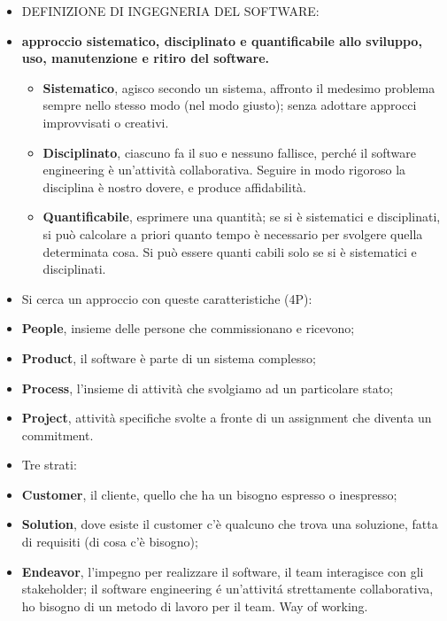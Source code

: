 \documentclass[a4paper,10pt] {article}
\begin{document}
\begin{itemize}
\item DEFINIZIONE DI INGEGNERIA DEL SOFTWARE:

\item \textbf{approccio sistematico, disciplinato e quantificabile allo sviluppo,
uso, manutenzione e ritiro del software.}
	\begin{itemize}
\item \textbf{Sistematico}, agisco secondo un sistema, affronto il medesimo
problema sempre nello stesso modo (nel modo
		giusto); senza adottare approcci improvvisati o creativi.

\item \textbf{Disciplinato}, ciascuno fa il suo e nessuno fallisce, perché il
software engineering è un'attività collaborativa. Seguire in modo
		rigoroso la disciplina è nostro dovere, e  produce affidabilità.

\item \textbf{Quantificabile}, esprimere una quantità; se si è sistematici e
disciplinati, si può calcolare a priori quanto tempo è necessario per
svolgere quella determinata cosa. Si può essere quanti cabili solo se si è
sistematici e disciplinati.
	\end{itemize}

\item Si cerca un approccio con queste caratteristiche (4P):

\item  \textbf{People}, insieme delle persone che commissionano e ricevono;
\item \textbf{Product}, il software è parte di un sistema complesso;
\item \textbf{Process}, l'insieme di attività che svolgiamo ad un particolare
stato;
\item \textbf{Project}, attività specifiche svolte a fronte di un assignment
che diventa un commitment.

\item Tre strati:

\item \textbf{Customer}, il cliente, quello che ha un bisogno espresso o
inespresso;
\item \textbf{Solution}, dove esiste il customer c'è qualcuno che trova una
soluzione, fatta di requisiti (di cosa c'è
bisogno);
\item \textbf{Endeavor}, l'impegno per realizzare il software, il team interagisce
con gli stakeholder; il software engineering \'e un'attivit\'a
strettamente collaborativa, ho bisogno di un metodo di lavoro per il team. Way of
working.


\end{itemize}
\end{document}
